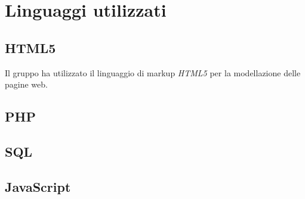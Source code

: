 \section{Linguaggi utilizzati}

\subsection{HTML5}
Il gruppo ha utilizzato il linguaggio di markup \textit{HTML5} per la
modellazione delle pagine web.

\subsection{PHP}


\subsection{SQL}


\subsection{JavaScript}
